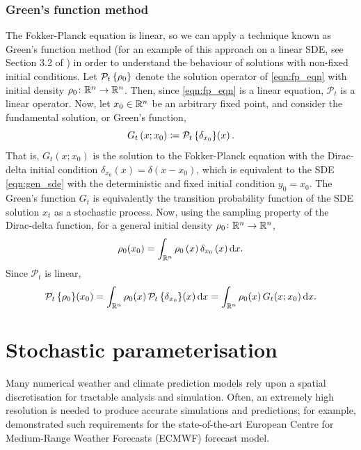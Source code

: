 \subsubsection{Green's function method}
The Fokker-Planck equation is linear, so we can apply a technique known as Green's function method (for an example of this approach on a linear SDE, see Section 3.2 of \citet{Risken_2012_FokkerPlanckEquationMethods}) in order to understand the behaviour of solutions with non-fixed initial conditions.
Let \(\mathcal{P}_t\set{\rho_0}\) denote the solution operator of \eqref{eqn:fp_eqn} with initial density \(\rho_0\colon \mathbb{R}^n \to \mathbb{R}^n\).
Then, since \eqref{eqn:fp_eqn} is a linear equation, \(\mathcal{P}_t\) is a linear operator.
Now, let \(x_0 \in \mathbb{R}^n\) be an arbitrary fixed point, and consider the fundamental solution, or Green's function,
\[
	G_t\left(x; x_0\right) \coloneqq \mathcal{P}_t\set{\delta_{x_0}}\!\left(x\right).
\]
That is, \(G_t\left(x; x_0\right)\) is the solution to the Fokker-Planck equation with the Dirac-delta initial condition \(\delta_{x_0}(x) = \delta\left(x - x_0\right)\), which is equivalent to the SDE \eqref{eqn:gen_sde} with the deterministic and fixed initial condition \(y_0 = x_0\).
The Green's function \(G_t\) is equivalently the transition probability function of the SDE solution \(x_t\) as a stochastic process.
Now, using the sampling property of the Dirac-delta function, for a general initial density \(\rho_0\colon \mathbb{R}^n \to \mathbb{R}^n\),
\[
	\rho_0(x_0) = \int_{\R^n}{\rho_0\left(x\right)\delta_{x_0}\left(x\right)\dif x}.
\]
Since \(\mathcal{P}_t\) is linear,
\begin{equation}
	\mathcal{P}_t\set{\rho_0}\!\left(x_0\right) = \int_{\R^n}{\rho_0\!\left(x\right)\mathcal{P}_t\set{\delta_{x_0}}\!\left(x\right)\dif x} = \int_{\R^n}{\rho_0\!\left(x\right) G_t\!\left(x; x_0\right)\dif x}.
	\label{eqn:fp_greens_trick}
\end{equation}



\section{Stochastic parameterisation}\label{sec:stoch_param}

Many numerical weather and climate prediction models rely upon a spatial discretisation for tractable analysis and simulation.
Often, an extremely high resolution is needed to produce accurate simulations and predictions; for example, \citet{DawsonEtAl_2012_SimulatingRegimeStructures} demonstrated such requirements for the state-of-the-art European Centre for Medium-Range Weather Forecasts (ECMWF) forecast model.

